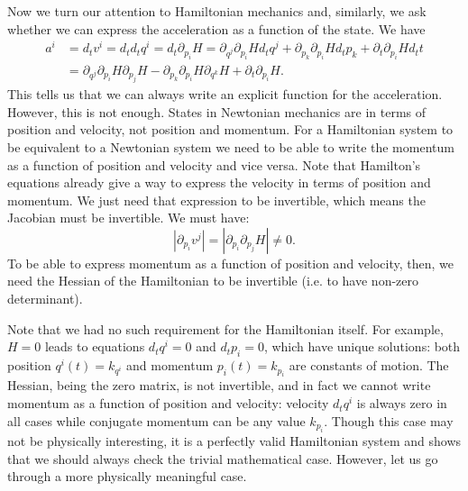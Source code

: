 Now we turn our attention to Hamiltonian mechanics and, similarly, we ask whether we can express the acceleration as a function of the state. We have
\begin{equation}
	\begin{aligned}
		a^i &= d_t v^i = d_t d_t q^i = d_t \partial_{p_i} H = \partial_{q^j} \partial_{p_i} H d_t q^j + \partial_{p_k} \partial_{p_i} H d_t p_k + \partial_{t} \partial_{p_i} H d_t t\\
		&= \partial_{q^j} \partial_{p_i} H \partial_{p_j} H - \partial_{p_k} \partial_{p_i} H \partial_{q^k} H + \partial_{t} \partial_{p_i} H.
	\end{aligned}
\end{equation}
This tells us that we can always write an explicit function for the acceleration. However, this is not enough. States in Newtonian mechanics are in terms of position and velocity, not position and momentum. For a Hamiltonian system to be equivalent to a Newtonian system we need to be able to write the momentum as a function of position and velocity and vice versa. Note that Hamilton's equations already give a way to express the velocity in terms of position and momentum. We just need that expression to be invertible, which means the Jacobian must be invertible. We must have:
\begin{equation}
	\left|\partial_{p_i} v^j\right| = \left|\partial_{p_i}\partial_{p_j} H\right| \neq 0 .
\end{equation}
To be able to express momentum as a function of position and velocity, then, we need the Hessian of the Hamiltonian to be invertible (i.e. to have non-zero determinant).

Note that we had no such requirement for the Hamiltonian itself. For example, $H=0$ leads to equations $d_t q^i = 0$ and $d_t p_i = 0$, which have unique solutions: both position $q^i(t) = k_{q^i}$ and momentum $p_i(t) = k_{p_i}$ are constants of motion. The Hessian, being the zero matrix, is not invertible, and in fact we cannot write momentum as a function of position and velocity: velocity $d_t q^i$ is always zero in all cases while conjugate momentum can be any value $k_{p_i}$. Though this case may not be physically interesting, it is a perfectly valid Hamiltonian system and shows that we should always check the trivial mathematical case. However, let us go through a more physically meaningful case.

